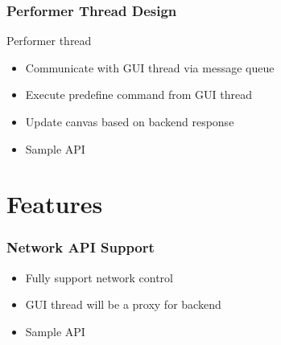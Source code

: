 \documentclass[t]{beamer}
\begin{document}
\begin{frame}
\frametitle{Performer Thread Design}
Performer thread
  \begin{itemize}
    \item Communicate with GUI thread via message queue 
    \item Execute predefine command from GUI thread 
    \item Update canvas based on backend response  
    \item Sample API
  \end{itemize}
  \begin{figure}[H] %
  \end{figure}
\end{frame}

\section{Features}
\begin{frame}
\frametitle{Network API Support}
  \begin{itemize}
    \item Fully support network control 
    \item GUI thread will be a proxy for backend  
    \item Sample API
  \end{itemize}
   \begin{figure}[H] %
  \end{figure}
\end{frame}
\end{document}
